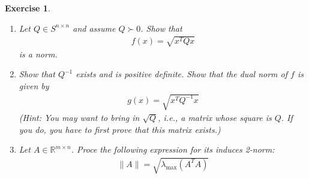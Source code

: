 \documentclass[12pt]{article}
\theoremstyle{colon}
\newtheorem{exercise}{Exercise}
\begin{document}
\begin{exercise}
  \leavevmode
  \begin{enumerate}[label=\arabic*)]
    \item Let $Q \in S^{n \times n}$ and assume $Q \succ 0$. Show that
      \begin{gather*}
        f(x) = \sqrt{ x^T Q x}
      \end{gather*}
      is a norm.

    \item Show that $Q^{-1}$ exists and is positive definite. Show that the dual norm of $f$ is given by
      \begin{gather*}
        g(x) = \sqrt{x^T Q^{-1} x}
      \end{gather*}
      (Hint: You may want to bring in $\sqrt{Q}$, i.e., a matrix whose square is $Q$. If you do, you have to first prove that this matrix exists.)

    \item Let $A \in \mathbb{R}^{m \times n}$. Proce the following expression for its induces 2-norm:
      \begin{gather*}
        \lVert A \rVert = \sqrt{\lambda_{\text{max}}(A^T A)}
      \end{gather*}
  \end{enumerate}
\end{exercise}
\end{document}
